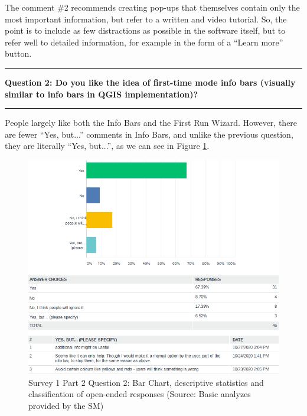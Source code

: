 \documentclass[a4paper,10pt,twoside]{article}
\begin{document}
\noindent The comment \#2 recommends creating pop-ups that themselves contain only the most important information, but refer to a written and video tutorial. So, the point is to include as few distractions as possible in the software itself, but to refer well to detailed information, for example in the form of a ``Learn more'' button.

\par\noindent\rule{\textwidth}{0.4pt}
\noindent \textbf{Question 2: Do you like the idea of first-time mode info bars (visually similar to info bars in QGIS implementation)?}
\par\noindent\rule{\textwidth}{0.4pt}

\noindent People largely like both the Info Bars and the First Run Wizard. However, there are fewer ``Yes, but...'' comments in Info Bars, and unlike the previous question, they are literally ``Yes, but...'', as we can see in Figure \ref{fig:survey1_part2_question2_all}. 

\vspace{0.3cm}
\begin{figure}[hbt!] 
\begin{center}
\includegraphics[width=15.5cm]{../surveys/analyzed_data/survey1_part2_question2_all.png} 
\caption[Survey 1 Part 2 Question 2: Bar Chart descriptive statistics and classification of open-ended responses]{Survey 1 Part 2 Question 2: Bar Chart, descriptive statistics and classification of  open-ended responses (Source: Basic analyzes provided by the SM)}
\label{fig:survey1_part2_question2_all}
\end{center}
\end{figure}
\end{document}
